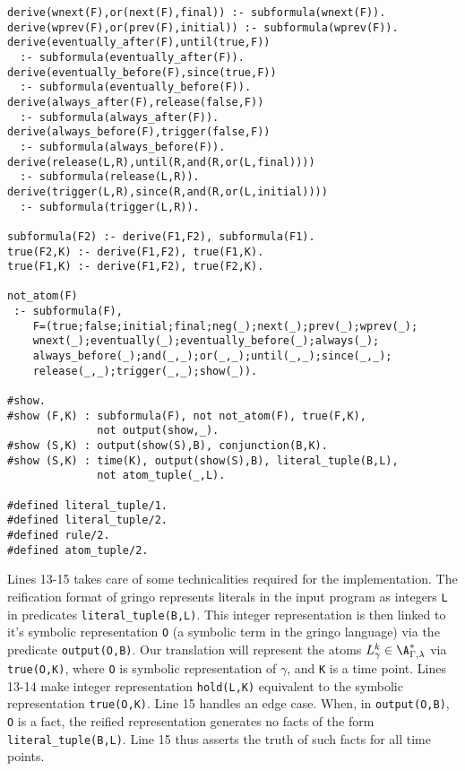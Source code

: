 \begin{center}
\begin{minipage}{\linewidth}
  \begin{lstlisting}[language=clingo, label={lst:meta-telingo2}]
derive(wnext(F),or(next(F),final)) :- subformula(wnext(F)).
derive(wprev(F),or(prev(F),initial)) :- subformula(wprev(F)).
derive(eventually_after(F),until(true,F)) 
  :- subformula(eventually_after(F)).
derive(eventually_before(F),since(true,F)) 
  :- subformula(eventually_before(F)).
derive(always_after(F),release(false,F)) 
  :- subformula(always_after(F)).
derive(always_before(F),trigger(false,F)) 
  :- subformula(always_before(F)).
derive(release(L,R),until(R,and(R,or(L,final)))) 
  :- subformula(release(L,R)).
derive(trigger(L,R),since(R,and(R,or(L,initial)))) 
  :- subformula(trigger(L,R)).

subformula(F2) :- derive(F1,F2), subformula(F1).
true(F2,K) :- derive(F1,F2), true(F1,K).
true(F1,K) :- derive(F1,F2), true(F2,K).

not_atom(F) 
 :- subformula(F), 
    F=(true;false;initial;final;neg(_);next(_);prev(_);wprev(_);
    wnext(_);eventually(_);eventually_before(_);always(_);
    always_before(_);and(_,_);or(_,_);until(_,_);since(_,_);
    release(_,_);trigger(_,_);show(_)).

#show.
#show (F,K) : subformula(F), not not_atom(F), true(F,K), 
              not output(show,_).
#show (S,K) : output(show(S),B), conjunction(B,K).
#show (S,K) : time(K), output(show(S),B), literal_tuple(B,L), 
              not atom_tuple(_,L).

#defined literal_tuple/1.
#defined literal_tuple/2.
#defined rule/2.
#defined atom_tuple/2.
\end{lstlisting}
\end{minipage}
\end{center}

Lines 13-15 takes care of some technicalities required for the
implementation. The reification format of gringo represents literals
in the input program as integers \verb|L| in predicates
\verb|literal_tuple(B,L)|. This integer representation is then linked
to it's symbolic representation \verb|O| (a symbolic term in the
gringo language) via the predicate \verb|output(O,B)|. Our translation
will represent the atoms $L_\gamma^k \in \A_{\Gamma,\lambda}^*$ via
\verb|true(O,K)|, where \verb|O| is symbolic representation of
$\gamma$, and \verb|K| is a time point. Lines 13-14 make integer
representation \verb|hold(L,K)| equivalent to the symbolic
representation \verb|true(O,K)|. Line 15 handles an edge case. When,
in \verb|output(O,B)|, \verb|O| is a fact, the reified representation
generates no facts of the form \verb|literal_tuple(B,L)|. Line 15 thus
asserts the truth of such facts for all time points.


